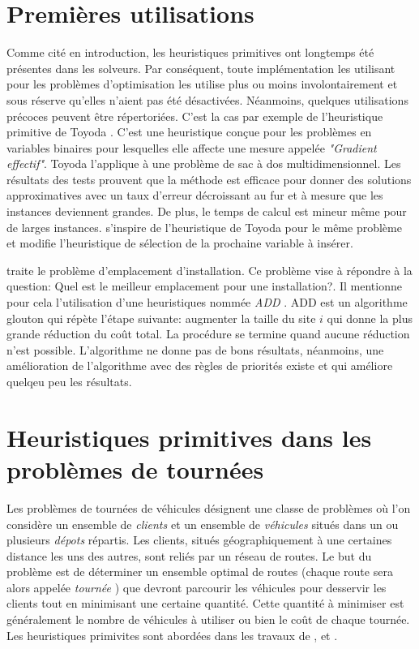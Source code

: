\documentclass[12pt,a4paper,oneside]{book}
\theoremstyle{definition}
\begin{document}
	
	\section{Premières utilisations}
	Comme cité en introduction, les heuristiques primitives ont longtemps été présentes dans les solveurs. Par conséquent, toute implémentation les utilisant pour les problèmes d'optimisation les utilise plus ou moins involontairement et sous réserve qu'elles n'aient pas été désactivées. Néanmoins, quelques utilisations précoces peuvent être répertoriées. C'est la cas par exemple de l'heuristique primitive de Toyoda \cite{Toyoda1975}. C'est une heuristique conçue pour les problèmes en variables binaires pour lesquelles elle affecte une mesure appelée \textit{"Gradient effectif"}. Toyoda l'applique à une problème de sac à dos multidimensionnel. Les résultats des tests prouvent que la méthode est efficace pour donner des solutions approximatives avec un taux d'erreur décroissant au fur et à mesure que les instances deviennent grandes. De plus, le temps de calcul est mineur même pour de larges instances. 
	\cite{Loulou1979} s'inspire de l'heuristique de Toyoda pour le même problème et modifie l'heuristique de sélection de la prochaine variable à insérer.
	
	\cite{Holmberg} traite le problème d'emplacement d'installation. Ce problème vise à répondre à la question: Quel est le meilleur emplacement pour une installation?. Il mentionne pour cela l'utilisation d'une heuristiques nommée \textit{ADD} \cite{Domschke1985}. ADD est un algorithme glouton qui répète l'étape suivante: augmenter la taille du site $i$ qui donne la plus grande réduction du coût total. La procédure se termine quand aucune réduction n'est possible. L'algorithme ne donne pas de bons résultats, néanmoins, une amélioration de l'algorithme avec des règles de priorités existe et qui améliore quelqeu peu les résultats.

    
	\section{Heuristiques primitives dans les problèmes de tournées}
	    Les problèmes de tournées de véhicules désignent une classe de problèmes où l'on considère un ensemble de \textit{clients} et un ensemble de \textit{véhicules} situés dans un ou plusieurs \textit{dépots} répartis. Les clients, situés géographiquement à une certaines distance les uns des autres, sont reliés par un réseau de routes. Le but du problème est de déterminer un ensemble optimal de routes (chaque route sera alors appelée \textit{tournée} ) que devront parcourir les véhicules pour desservir les clients tout en minimisant une certaine quantité. Cette quantité à minimiser est généralement le nombre de véhicules à utiliser ou bien le coût de chaque tournée.
	    Les heuristiques primivites sont abordées dans les travaux de \cite{Agra2014}, \cite{Cacchiani2014} et \cite{Bettinelli2014}.
	    
\end{document}
